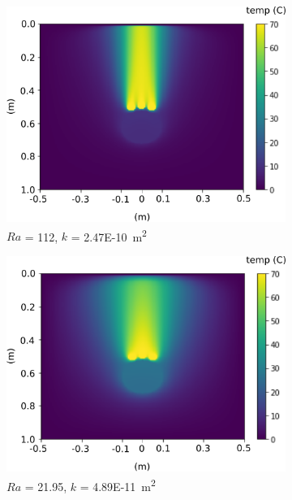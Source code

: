 \documentclass[Journal,letterpaper,InsideFigs]{ascelike-new}
\begin{document}
\begin{figure}
\begin{subfigure}[b]{0.49\textwidth}
    \includegraphics[width=\textwidth]{figs/ra/112.png}
    \caption{$Ra$ = 112, $k$ = \SI{2.47E-10}{\meter\squared}}
 \end{subfigure}
 \begin{subfigure}[b]{0.49\textwidth}
    \includegraphics[width=\textwidth]{figs/ra/21.png}
    \caption{$Ra$ = 21.95, $k$ = \SI{4.89E-11}{\meter\squared}}
 \end{subfigure}\\ 
 \begin{subfigure}[b]{0.49\textwidth}

\end{subfigure}
\end{figure}
\end{document}
